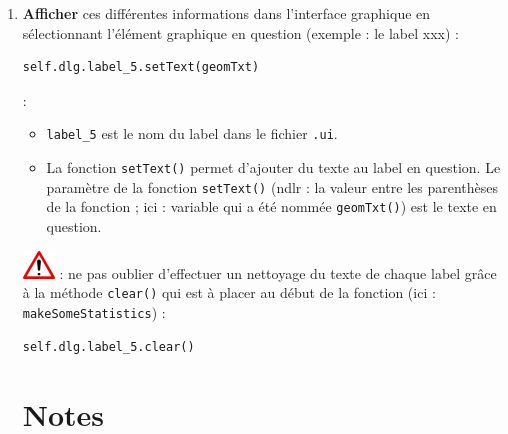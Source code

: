 \documentclass[11pt]{article}
\begin{document}
\begin{enumerate}
\item \textbf{Afficher} ces différentes informations dans l'interface graphique en sélectionnant l'élément graphique en question (exemple : le label xxx) : 
\vspace*{-1em}
\begin{center}
\begin{minipage}[t]{0.4\textwidth}
\begin{verbatim}
self.dlg.label_5.setText(geomTxt)
\end{verbatim}
\end{minipage}
\end{center}


\underline{}:

\begin{itemize}\itemsep0.2em
\renewcommand\labelitemi{\---}
\item \og{}\texttt{label\_5}\fg{} est le nom du label dans le fichier \og{}\texttt{.ui}\fg{}. 
\item La fonction \og{}\texttt{setText()}\fg{} permet d'ajouter du texte au label en question. Le paramètre de la fonction \og{}\texttt{setText()}\fg{} (ndlr : la valeur entre les parenthèses de la fonction ; ici : variable qui a été nommée \og{}\texttt{geomTxt()}\fg{}) est le texte en question. 
\end{itemize}

\includegraphics[scale=1]{warningt.png} \underline{}: ne pas oublier d'effectuer un nettoyage du texte de chaque label grâce à la méthode \og{}\texttt{clear()}\fg{} qui est à placer au début de la fonction (ici : \og{}\texttt{makeSomeStatistics}\fg{}) :
\vspace*{-1em}
\begin{center}
\begin{minipage}[t]{0.30\textwidth}
\begin{verbatim}
self.dlg.label_5.clear()
\end{verbatim}
\end{minipage}
\end{center}


\section*{Notes}
\hrulefill
\vspace*{1.6em}


\end{enumerate}
\end{document}
